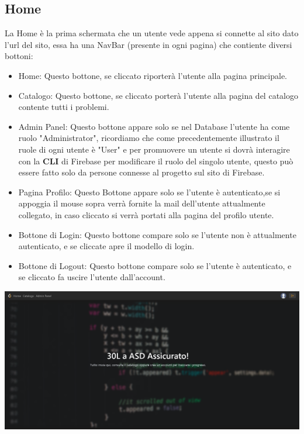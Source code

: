 \documentclass[11pt, a4paper]{article}
\theoremstyle{definition}
\begin{document}
\subsection{Home}
La Home è la prima schermata che un utente vede appena si connette al sito dato l'url del sito, essa ha una NavBar (presente in ogni pagina) che contiente diversi bottoni:
\begin{itemize}
  \item Home: Questo bottone, se cliccato riporterà l'utente alla pagina principale.
  \item Catalogo: Questo bottone, se cliccato porterà l'utente alla pagina del catalogo contente tutti i problemi.
  \item Admin Panel: Questo bottone appare solo se nel Database l'utente ha come ruolo "Administrator", ricordiamo che come precedentemente illustrato il ruole di ogni utente è "User" e per promuovere un utente
  si dovrà interagire con la \textbf{CLI} di Firebase per modificare il ruolo del singolo utente, questo può essere fatto solo da persone connesse al progetto sul sito di Firebase.
  \item Pagina Profilo: Questo Bottone appare solo se l'utente è autenticato,se si appoggia il mouse sopra verrà fornite la mail dell'utente attualmente collegato, in caso cliccato si verrà portati alla pagina del profilo utente.
  \item Bottone di Login: Questo bottone compare solo se l'utente non è attualmente autenticato, e se cliccate apre il modello di login.
  \item Bottone di Logout: Questo bottone compare solo se l'utente è autenticato, e se cliccato fa uscire l'utente dall'account.
\end{itemize}
\includegraphics[width=\textwidth]{materiale/sito/Home.png}

\newpage
\end{document}
